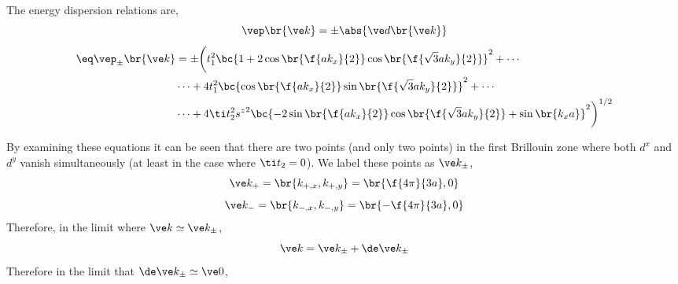 \documentclass{article}
\begin{document}
The energy dispersion relations are,
\[ \vep\br{\ve k} = \pm\abs{\ve d\br{\ve k}} \]
\begin{align*}
\eq \label{eq:gp_dispersion}
\vep_{\pm}\br{\ve k}
&= \pm \bigg(t_1^2\bc{1 + 2 \cos \br{\f{ak_x}{2}}\cos \br{\f{\sqrt{3}ak_y}{2}}}^2 + \cdots \\
&\cdots + 4t_1^2\bc{\cos \br{\f{ak_x}{2}}\sin \br{\f{\sqrt{3}ak_y}{2}}}^2 + \cdots \\
&\cdots + 4\ti t_2^2{s^{z}}^2\bc{-2 \sin \br{\f{ak_x}{2}}\cos \br{\f{\sqrt{3}ak_y}{2}} + \sin\br{k_x a}}^2\bigg)^{1/2}
\end{align*}

By examining these equations it can be seen that there are two points (and only two points) in the first Brillouin zone where both $d^{x}$ and $d^y$ vanish simultaneously (at least in the case where $\ti t_2 = 0$). We label these points as $\ve k_{\pm}$,
\[ \ve k_+ = \br{k_{+, x}, k_{+, y}} = \br{\f{4 \pi }{3a}, 0} \]
\[ \ve k_- = \br{k_{-, x}, k_{-, y}} = \br{-\f{4 \pi }{3a}, 0} \]
Therefore, in the limit where $\ve k \simeq \ve k_{\pm}$,
\[ \ve k = \ve k_{\pm} + \de \ve k_{\pm} \]
Therefore in the limit that $\de \ve k_{\pm} \simeq \ve 0$,
\end{document}
